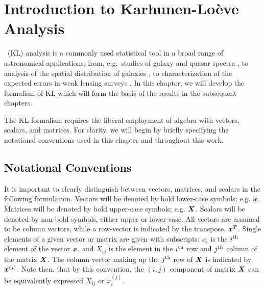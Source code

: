 \chapter{Introduction to Karhunen-Lo\`{e}ve Analysis}



\KL\ (KL) analysis is a commonly used statistical tool
in a broad range of astronomical applications, from, e.g.~studies of 
galaxy and quasar spectra \citep{Connolly95,Connolly99,Yip04a,Yip04b}, to 
analysis of the spatial distribution of galaxies 
\citep{Vogeley96,Matsubara00,Pope04}, to characterization of the 
expected errors in weak lensing surveys \citep{Kilbinger06, Munshi06}.
In this chapter, we will develop the formalism of KL which will form
the basis of the results in the subsequent chapters.

The KL formalism requires the liberal
employment of algebra with vectors, scalars, and matrices.
For clarity, we will begin by briefly specifying the notational
conventions used in this chapter and throughout this work.

\section{Notational Conventions}

It is important to clearly distinguish between vectors, matrices, and
scalars in the following formulation.  Vectors will be denoted by
bold lower-case symbols; e.g. $\boldsymbol{x}$.  Matrices will be denoted by
bold upper-case symbols; e.g. $\boldsymbol{X}$.  Scalars will be denoted by
non-bold symbols, either upper or lower-case.
All vectors are assumed to be column vectors, while a row-vector is
indicated by the transpose, $\boldsymbol{x}^T$.  
Single elements of a given
vector or matrix are given with subscripts: $x_i$ is the $i^{\rm th}$
element of the vector $\boldsymbol{x}$, and $X_{ij}$ is the element in the
$i^{\rm th}$ row and $j^{\rm th}$ column of the matrix $\boldsymbol{X}$.
The column vector making up the $j^{\rm th}$ row of $\boldsymbol{X}$ is
indicated by $\boldsymbol{x}^{(j)}$.  Note then, that by this convention,
the $(i, j)$ component of matrix $\boldsymbol{X}$ can be equivalently expressed
$X_{ij}$ or $x_i^{(j)}$.

